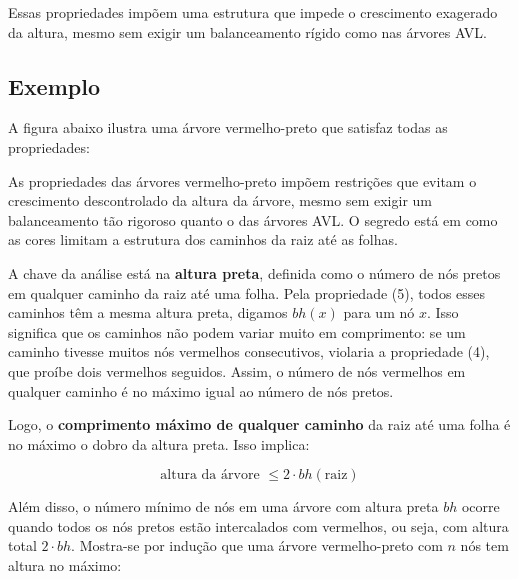 Essas propriedades impõem uma estrutura que impede o crescimento exagerado da altura, mesmo sem exigir um balanceamento rígido como nas árvores AVL.

\subsection*{Exemplo}

A figura abaixo ilustra uma árvore vermelho-preto que satisfaz todas as propriedades:

\begin{center}
\end{center}


As propriedades das árvores vermelho-preto impõem restrições que evitam o crescimento descontrolado da altura da árvore, mesmo sem exigir um balanceamento tão rigoroso quanto o das árvores AVL. 
O segredo está em como as cores limitam a estrutura dos caminhos da raiz até as folhas.

A chave da análise está na \textbf{altura preta}, definida como o número de nós pretos em qualquer caminho da raiz até uma folha. 
Pela propriedade (5), todos esses caminhos têm a mesma altura preta, digamos $bh(x)$ para um nó $x$. 
Isso significa que os caminhos não podem variar muito em comprimento: se um caminho tivesse muitos nós vermelhos consecutivos, violaria a propriedade (4), que proíbe dois vermelhos seguidos. 
Assim, o número de nós vermelhos em qualquer caminho é no máximo igual ao número de nós pretos.

Logo, o \textbf{comprimento máximo de qualquer caminho} da raiz até uma folha é no máximo o dobro da altura preta. 
Isso implica:

\[
\text{altura da árvore } \leq 2 \cdot bh(\text{raiz})
\]

Além disso, o número mínimo de nós em uma árvore com altura preta $bh$ ocorre quando todos os nós pretos estão intercalados com vermelhos, ou seja, com altura total $2 \cdot bh$. 
Mostra-se por indução que uma árvore vermelho-preto com $n$ nós tem altura no máximo:

